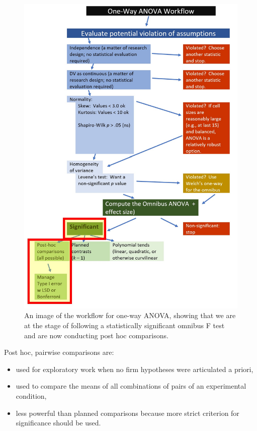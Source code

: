 \documentclass[
  11pt,
]{book}
\providecommand{\tightlist}{%
  \setlength{\itemsep}{0pt}\setlength{\parskip}{0pt}}
\begin{document}
\begin{figure}
\centering
\includegraphics{images/oneway/OnewayWrkFlw_phoc.jpg}
\caption{An image of the workflow for one-way ANOVA, showing that we are at the stage of following a statistically significant omnibus F test and are now conducting post hoc comparisons.}
\end{figure}

Post hoc, pairwise comparisons are:

\begin{itemize}
\tightlist
\item
  used for exploratory work when no firm hypotheses were articulated a priori,
\item
  used to compare the means of all combinations of pairs of an experimental condition,
\item
  less powerful than planned comparisons because more strict criterion for significance should be used.
\end{itemize}
\end{document}
